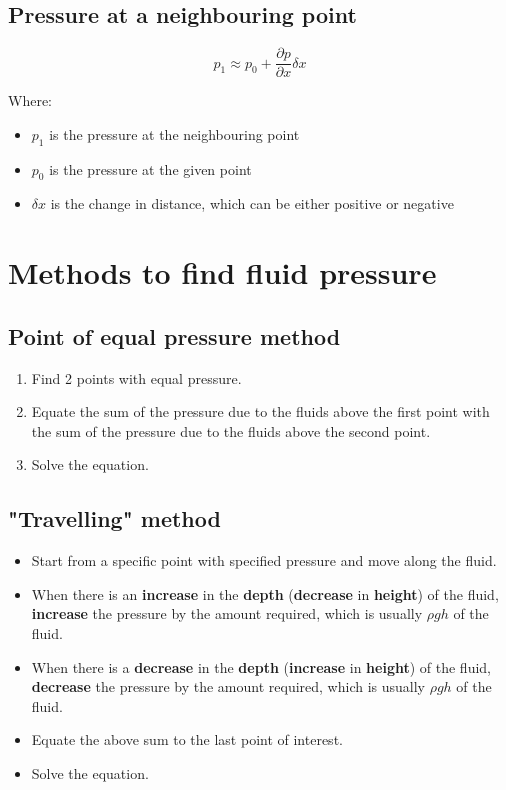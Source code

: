 \documentclass[11pt]{article}
\begin{document}
\subsection{Pressure at a neighbouring point}
\label{sec:org7afde09}
\[p_1 \approx p_0 + \frac{\partial p}{\partial x} \delta x\]

Where:
\begin{itemize}
\item \(p_1\) is the pressure at the neighbouring point
\item \(p_0\) is the pressure at the given point
\item \(\delta x\) is the change in distance, which can be either positive or negative
\end{itemize}

\newpage

\section{Methods to find fluid pressure}
\label{sec:org47a6571}

\subsection{Point of equal pressure method}
\label{sec:orgdd49e6f}
\begin{enumerate}
\item Find 2 points with equal pressure.
\item Equate the sum of the pressure due to the fluids above the first point with the sum of the pressure due to the fluids above the second point.
\item Solve the equation.
\end{enumerate}

\subsection{"Travelling" method}
\label{sec:orgecfe6a6}
\begin{itemize}
\item Start from a specific point with specified pressure and move along the fluid.
\item When there is an \textbf{increase} in the \textbf{depth} (\textbf{decrease} in \textbf{height}) of the fluid, \textbf{increase} the pressure by the amount required, which is usually \(\rho g h\) of the fluid.
\item When there is a \textbf{decrease} in the \textbf{depth} (\textbf{increase} in \textbf{height}) of the fluid, \textbf{decrease} the pressure by the amount required, which is usually \(\rho g h\) of the fluid.
\item Equate the above sum to the last point of interest.
\item Solve the equation.
\end{itemize}
\end{document}
